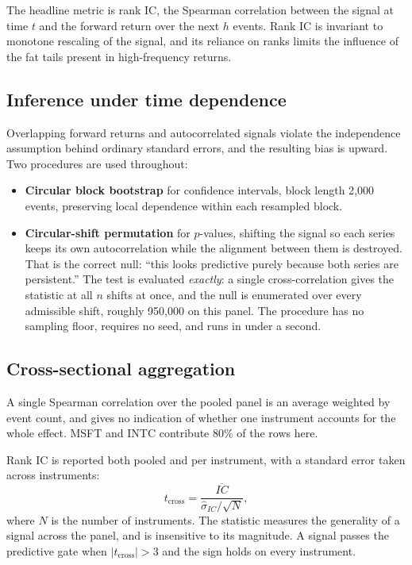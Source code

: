 \documentclass[11pt]{scrartcl}
\begin{document}
The headline metric is rank IC, the Spearman correlation between the signal at time $t$ and the forward return over the next $h$ events. Rank IC is invariant to monotone rescaling of the signal, and its reliance on ranks limits the influence of the fat tails present in high-frequency returns.

\subsection{Inference under time dependence}
\label{sec:inference}

Overlapping forward returns and autocorrelated signals violate the independence assumption behind ordinary standard errors, and the resulting bias is upward. Two procedures are used throughout:

\begin{itemize}
\item \textbf{Circular block bootstrap} for confidence intervals, block length 2{,}000 events, preserving local dependence within each resampled block.
\item \textbf{Circular-shift permutation} for $p$-values, shifting the signal so each series keeps its own autocorrelation while the alignment between them is destroyed. That is the correct null: ``this looks predictive purely because both series are persistent.'' The test is evaluated \emph{exactly}: a single cross-correlation gives the statistic at all $n$ shifts at once, and the null is enumerated over every admissible shift, roughly 950{,}000 on this panel. The procedure has no sampling floor, requires no seed, and runs in under a second.
\end{itemize}

\subsection{Cross-sectional aggregation}
\label{sec:crosssec}

A single Spearman correlation over the pooled panel is an average weighted by event count, and gives no indication of whether one instrument accounts for the whole effect. MSFT and INTC contribute 80\% of the rows here.

Rank IC is reported both pooled and per instrument, with a standard error taken across instruments:
\begin{equation}
t_{\mathrm{cross}} = \frac{\overline{IC}}{\hat{\sigma}_{IC} / \sqrt{N}},
\label{eq:tcross}
\end{equation}
where $N$ is the number of instruments. The statistic measures the generality of a signal across the panel, and is insensitive to its magnitude. A signal passes the predictive gate when $|t_{\mathrm{cross}}| > 3$ and the sign holds on every instrument.
\end{document}
